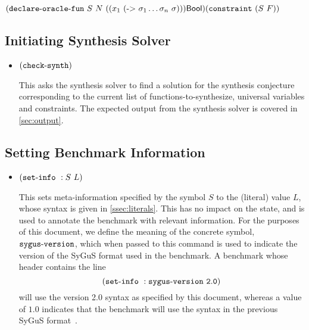 \documentclass[english,a4paper,10pt]{article}
\begin{document}
\begin{itemize}
$
\paren{\oracledeckwd\mbox{ }S\mbox{ }N\mbox{ }\paren{\paren{
x_1\mbox{ }
\paren{
\funsortkwd \mbox{ } \sigma_1 \ldots \sigma_n\mbox{ }\sigma }}}
\sbool}\\
%
\paren{\constraintkwd \mbox{ } \paren{S \mbox{ } F}}
$






\end{itemize}	


\subsection{Initiating Synthesis Solver}

\begin{itemize}
\item ${\tt (}{\tt check\mbox{-}synth}{\tt )}$

This asks the synthesis solver to find a solution for the synthesis conjecture
corresponding to the current list of functions-to-synthesize,
universal variables and constraints.
The expected output
from the synthesis solver is covered in \cref{sec:output}.
\end{itemize}

\subsection{Setting Benchmark Information}

\begin{itemize}
\item ${\tt (}{\tt set\mbox{-}info}\mbox{ }:S\mbox{ }L{\tt )}$

This sets meta-information specified by the symbol $S$
to the (literal) value $L$, whose syntax is given in \cref{ssec:literals}.
This has no impact on the state, and is used to annotate the
benchmark with relevant information.
For the purposes of this document, we define the meaning of
the concrete symbol, ${\tt sygus\mbox{-}version}$,
which when passed to this command is used to indicate the version of the SyGuS
format used in the benchmark.
A benchmark whose header contains the line
\[
{\tt (}{\tt set\mbox{-}info}\mbox{ }:{\tt sygus\mbox{-}version\mbox{ }2.0}{\tt )}
\]
will use the version 2.0 syntax as specified by this document,
whereas a value of $1.0$ indicates that the benchmark will use the
syntax in the previous SyGuS format~\cite{sygusFormat,sygusSyntax2015,sygusSyntax2016}.
\end{itemize}
\end{document}
